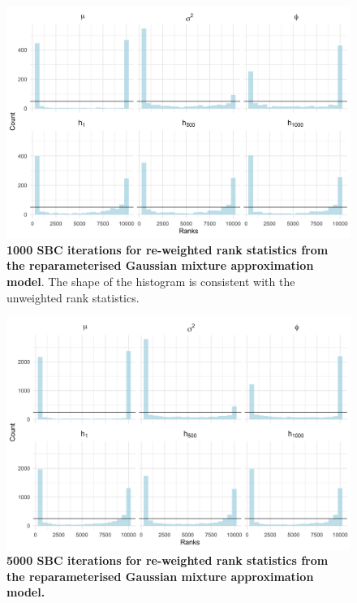 \documentclass[12pt, a4paper]{article}
\begin{document}
\begin{figure}[H]
    \centering
    \includegraphics[scale=0.09]{results/weighted_ksc_ncp_1k.png}
    \caption{\textbf{1000 SBC iterations for re-weighted rank statistics from the reparameterised Gaussian mixture approximation model}. The shape of the histogram is consistent with the unweighted rank statistics.}
    \label{fig:ncpreweight1k}
\end{figure}

\begin{figure}[H]
    \centering
    \includegraphics[scale=0.09]{results/weighted_ksc_ncp_5k.png}
    \caption{\textbf{5000 SBC iterations for re-weighted rank statistics from the reparameterised Gaussian mixture approximation model.}}
    \label{fig:ncpreweight5k}
\end{figure}
\end{document}
